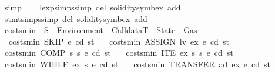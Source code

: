 \begin{isabellebody}
\ simp\isanewline
\ \ \isamarkupfalse%
\isanewline
{}\isamarkupfalse%
%
\endisatagproof
{\isafoldproof}%
%
\isadelimproof
\isanewline
%
\endisadelimproof
\isanewline
{}\isamarkupfalse%
\ lexp{\isachardot}{\kern0pt}simps{\isacharbrackleft}{\kern0pt}simp\ del{\isacharcomma}{\kern0pt}\ solidity{\isacharunderscore}{\kern0pt}symbex\ add{\isacharbrackright}{\kern0pt}\isanewline
{}\isamarkupfalse%
\ stmt{\isachardot}{\kern0pt}simps{\isacharbrackleft}{\kern0pt}simp\ del{\isacharcomma}{\kern0pt}\ solidity{\isacharunderscore}{\kern0pt}symbex\ add{\isacharbrackright}{\kern0pt}\isanewline
\isanewline
{}\isamarkupfalse%
%
\isadelimdocument
%
\endisadelimdocument
%
\isatagdocument
%
\isamarkuptrue%
%
\endisatagdocument
{\isafolddocument}%
%
\isadelimdocument
%
\endisadelimdocument
{}\isamarkupfalse%
\ costs{\isacharunderscore}{\kern0pt}min\ {\isacharcolon}{\kern0pt}{\isacharcolon}{\kern0pt}\ {\isachardoublequoteopen}S\ {\isasymRightarrow}\ Environment\ {\isasymRightarrow}\ CalldataT\ {\isasymRightarrow}\ State\ {\isasymRightarrow}\ Gas{\isachardoublequoteclose}\isanewline
\ \ \isanewline
\ \ {\isachardoublequoteopen}costs{\isacharunderscore}{\kern0pt}min\ SKIP\ e\ cd\ st\ {\isacharequal}{\kern0pt}\ {}{\isachardoublequoteclose}\isanewline
{\isacharbar}{\kern0pt}\ {\isachardoublequoteopen}costs{\isacharunderscore}{\kern0pt}min\ {\isacharparenleft}{\kern0pt}ASSIGN\ lv\ ex{\isacharparenright}{\kern0pt}\ e\ cd\ st\ {\isacharequal}{\kern0pt}\ {}{\isachardoublequoteclose}\isanewline
{\isacharbar}{\kern0pt}\ {\isachardoublequoteopen}costs{\isacharunderscore}{\kern0pt}min\ {\isacharparenleft}{\kern0pt}COMP\ s{}\ s{}{\isacharparenright}{\kern0pt}\ e\ cd\ st\ {\isacharequal}{\kern0pt}\ {}{\isachardoublequoteclose}\isanewline
{\isacharbar}{\kern0pt}\ {\isachardoublequoteopen}costs{\isacharunderscore}{\kern0pt}min\ {\isacharparenleft}{\kern0pt}ITE\ ex\ s{}\ s{}{\isacharparenright}{\kern0pt}\ e\ cd\ st\ {\isacharequal}{\kern0pt}\ {}{\isachardoublequoteclose}\isanewline
{\isacharbar}{\kern0pt}\ {\isachardoublequoteopen}costs{\isacharunderscore}{\kern0pt}min\ {\isacharparenleft}{\kern0pt}WHILE\ ex\ s{}{\isacharparenright}{\kern0pt}\ e\ cd\ st\ {\isacharequal}{\kern0pt}\ {}{\isachardoublequoteclose}\isanewline
{\isacharbar}{\kern0pt}\ {\isachardoublequoteopen}costs{\isacharunderscore}{\kern0pt}min\ {\isacharparenleft}{\kern0pt}TRANSFER\ ad\ ex{\isacharparenright}{\kern0pt}\ e\ cd\ st\ {\isacharequal}{\kern0pt}\ {}{\isachardoublequoteclose}\isanewline

\end{isabellebody}
